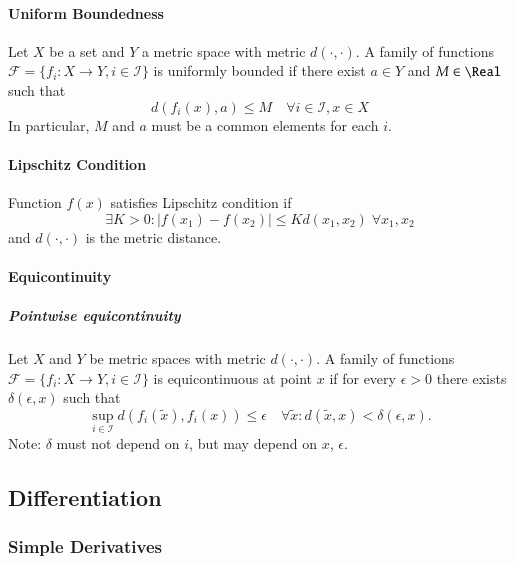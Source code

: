 \documentclass[a4paper]{article}
\numberwithin{equation}{subsection}
\begin{document}
\paragraph{Uniform Boundedness}

Let $X$ be a set and $Y$ a metric space with metric $d(\cdot,\cdot)$.
A family of functions $\mathcal{F} = \{f_{i}: X \to Y, i \in
\mathcal{I}\}$ is uniformly bounded if there exist $a\in Y$ and $M \in
\Real$ such that
\begin{equation}
  \label{eq:uniform_boundedness}
  d( f_{i}(x), a) \le M
  \quad 
  \forall i \in \mathcal{I}, x \in X
\end{equation}
In particular, $M$ and $a$ must be a common elements for each $i$.


\paragraph{Lipschitz Condition}

Function $f(x)$ satisfies Lipschitz condition if 
\begin{equation}
  \label{eq:lipschitz_condition}
  \exists K > 0: |f(x_{1}) - f(x_{2})| \le K d(x_{1}, x_{2})
  \; \forall x_{1}, x_{2}
\end{equation}
and $d(\cdot,\cdot)$ is the metric distance.


\paragraph{Equicontinuity}

\subparagraph{Pointwise equicontinuity}
Let $X$ and $Y$ be metric spaces with metric $d(\cdot,\cdot)$.
A family of functions $\mathcal{F} = \{f_{i}: X \to Y, i \in
\mathcal{I}\}$ is equicontinuous at point $x$ if for every $\epsilon >
0$ there exists $\delta(\epsilon, x)$ such that
\begin{equation}
  \label{eq:uniform_boundedness}
  \sup_{i \in \mathcal{I}} d( f_{i}(\tilde x), f_{i}(x)) \le \epsilon
  \quad 
  \forall \tilde x: d(\tilde x, x) < \delta(\epsilon, x).
\end{equation}
Note: $\delta$ must not depend on $i$, but may depend on $x$, $\epsilon$.




\subsection{Differentiation}

\subsubsection{Simple Derivatives}
\end{document}
